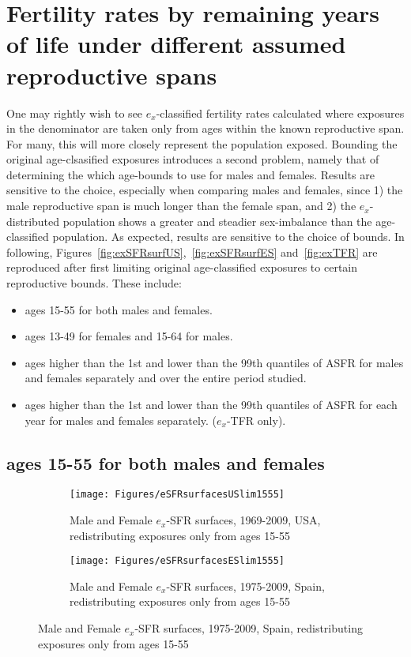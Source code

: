 % 

\chapter{Fertility rates by remaining years of life under different assumed
reproductive spans}
\label{Appendix:reprospans}
One may rightly wish to see $e_x$-classified fertility rates calculated where
exposures in the denominator are taken only from ages within the known
reproductive span. For many, this will more closely represent the population exposed. Bounding the
original age-clsasified exposures introduces a second problem, namely that of
determining the which age-bounds to use for males and females. Results are
sensitive to the choice, especially when comparing males and females, since 1)
the male reproductive span is much longer than the female span, and 2) the
$e_x$-distributed population shows a greater and steadier sex-imbalance than the
age-classified population. As expected, results are sensitive to the choice of
bounds. In following, Figures~\ref{fig:exSFRsurfUS},~\ref{fig:exSFRsurfES}
and~\ref{fig:exTFR} are reproduced after first limiting original
age-classified exposures to certain reproductive bounds. These include:

\begin{itemize}
  \item ages 15-55 for both males and females.
  \item ages 13-49 for females and 15-64 for males.
  \item ages higher than the 1st and lower than the 99th quantiles of ASFR for
  males and females separately and over the entire period studied.
  \item ages higher than the 1st and lower than the 99th quantiles of ASFR for
  each year for males and females separately. ($e_x$-TFR only).
\end{itemize}

\pagebreak

\section{ages 15-55 for both males and females}

\begin{figure}[ht!]
        \centering
        \begin{subfigure}
                \centering
                \caption{Male and Female $e_x$-SFR surfaces, 1969-2009, USA,
                redistributing exposures only from ages 15-55}
                \texttt{[image: Figures/eSFRsurfacesUSlim1555]}
                \label{fig:exSFRsurfUSlim15_55}
        \end{subfigure}
        \begin{subfigure}
                \centering
                \caption{Male and Female $e_x$-SFR surfaces, 1975-2009, Spain,
                redistributing exposures only from ages 15-55}
                \texttt{[image: Figures/eSFRsurfacesESlim1555]} 
                \label{fig:exSFRsurfESlim15_55}
        \end{subfigure}
\end{figure}

